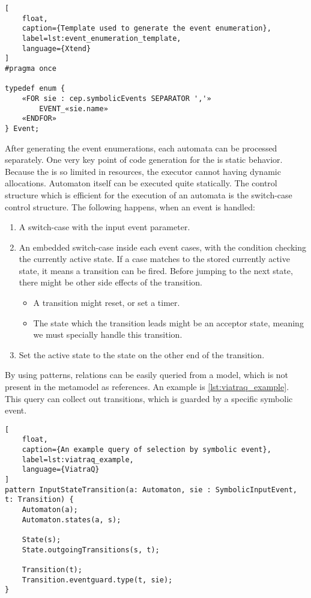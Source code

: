 \begin{lstlisting}[
	float,
	caption={Template used to generate the event enumeration},
	label=lst:event_enumeration_template,
	language={Xtend}
]
#pragma once

typedef enum {
	«FOR sie : cep.symbolicEvents SEPARATOR ','»
		EVENT_«sie.name»
	«ENDFOR»
} Event;
\end{lstlisting}

\needspace{5ex}
After generating the event enumerations, each automata can be processed separately. One very key point of \cpp{} code generation for the \pru{} is static behavior. Because the \pru{} is so limited in resources, the executor cannot having dynamic allocations. Automaton itself can be executed quite statically. The control structure which is efficient for the execution of an automata is the switch-case control structure. The following happens, when an event is handled:
\begin{enumerate}
	\item A switch-case with the input event parameter.
	\item An embedded switch-case inside each event cases, with the condition checking the currently active state. If a case matches to the stored currently active state, it means a transition can be fired. Before jumping to the next state, there might be other side effects of the transition.
	\begin{itemize}
		\item A transition might reset, or set a timer.
		\item The state which the transition leads might be an acceptor state, meaning we must specially handle this transition.
	\end{itemize}
	\item Set the active state to the state on the other end of the transition.
\end{enumerate}

By using \viatraq{} patterns, relations can be easily queried from a model, which is not present in the metamodel as references. An example is \cref{lst:viatraq_example}. This query can collect out transitions, which is guarded by a specific symbolic event.

\begin{lstlisting}[
	float,
	caption={An example query of selection by symbolic event},
	label=lst:viatraq_example,
	language={ViatraQ}
]
pattern InputStateTransition(a: Automaton, sie : SymbolicInputEvent, t: Transition) {
	Automaton(a);
	Automaton.states(a, s);

	State(s);
	State.outgoingTransitions(s, t);

	Transition(t);
	Transition.eventguard.type(t, sie);
}
\end{lstlisting}

